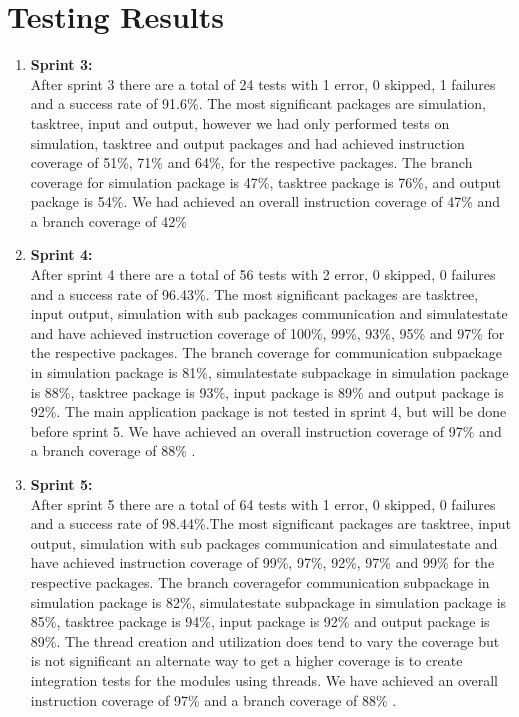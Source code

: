 \section{Testing Results}

\begin{enumerate}

\item \textbf{Sprint 3:} \\

After sprint 3 there are a total of  24  tests with 1 error, 0 skipped, 1 failures and a success rate of 91.6\%. The most significant packages are simulation, tasktree, input and output, however we had only performed tests on simulation, tasktree and output packages and had achieved instruction coverage of  51\%, 71\% and 64\%,  for the respective packages. The branch coverage for simulation package is 47\%, tasktree package is 76\%, and output package is 54\%.  We had achieved an overall instruction coverage of 47\% and a branch coverage of 42\%

\item \textbf{Sprint 4:} \\

After sprint 4 there are a total of 56 tests with 2 error, 0 skipped, 0 failures and a success rate of 96.43\%. The most significant packages are tasktree, input output, simulation with sub packages communication and simulatestate and have achieved instruction coverage of  100\%, 99\%, 93\%, 95\% and 97\%  for the respective packages. The branch coverage for communication subpackage in simulation package is 81\%, simulatestate subpackage in simulation package is 88\%, tasktree package is 93\%, input package is 89\% and output package is 92\%. The main application package is not tested in  sprint 4, but will be done before sprint 5. We have achieved an overall instruction coverage of 97\% and a branch coverage of 88\% .

\item \textbf{Sprint 5:} \\

After sprint 5 there are a total of 64 tests with 1 error, 0 skipped, 0 failures and a success rate of 98.44\%.The most significant packages are tasktree, input output, simulation with sub packages communication and simulatestate and have achieved instruction coverage of   99\%, 97\%, 92\%, 97\% and 99\% for the respective packages. The branch coveragefor communication subpackage in simulation package is 82\%,  simulatestate subpackage in simulation package is 85\%, tasktree package is 94\%, input package is 92\% and output package is 89\%. The thread creation and utilization does tend to vary the coverage but is not significant an alternate way to get a higher coverage is to create integration tests for the modules using threads. We have achieved an overall instruction coverage of 97\% and a branch coverage of 88\% .


\end{enumerate}
